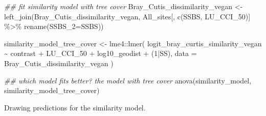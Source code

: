 \documentclass[
  letterpaper,
  DIV=11,
  numbers=noendperiod]{scrartcl}
\newenvironment{Shaded}{\begin{snugshade}}{\end{snugshade}}
\newcommand{\AttributeTok}[1]{\textcolor[rgb]{0.40,0.45,0.13}{#1}}
\newcommand{\DecValTok}[1]{\textcolor[rgb]{0.68,0.00,0.00}{#1}}
\newcommand{\DocumentationTok}[1]{\textcolor[rgb]{0.37,0.37,0.37}{\textit{#1}}}
\newcommand{\FunctionTok}[1]{\textcolor[rgb]{0.28,0.35,0.67}{#1}}
\newcommand{\NormalTok}[1]{\textcolor[rgb]{0.00,0.23,0.31}{#1}}
\newcommand{\OtherTok}[1]{\textcolor[rgb]{0.00,0.23,0.31}{#1}}
\newcommand{\SpecialCharTok}[1]{\textcolor[rgb]{0.37,0.37,0.37}{#1}}
\newcommand{\StringTok}[1]{\textcolor[rgb]{0.13,0.47,0.30}{#1}}
\begin{document}
\begin{Shaded}
\begin{Highlighting}[]
\DocumentationTok{\#\# fit similarity model with tree cover}
\NormalTok{Bray\_Cutis\_dissimilarity\_vegan }\OtherTok{\textless{}{-}} \FunctionTok{left\_join}\NormalTok{(Bray\_Cutis\_dissimilarity\_vegan, }
\NormalTok{                      All\_sites[, }\FunctionTok{c}\NormalTok{(}\StringTok{\textquotesingle{}SSBS\textquotesingle{}}\NormalTok{, }
                                    \StringTok{\textquotesingle{}LU\_CCI\_50\textquotesingle{}}\NormalTok{)] }\SpecialCharTok{\%\textgreater{}\%} 
                        \FunctionTok{rename}\NormalTok{(}\AttributeTok{SSBS\_2=}\NormalTok{SSBS))}

\NormalTok{similarity\_model\_tree\_cover }\OtherTok{\textless{}{-}}\NormalTok{ lme4}\SpecialCharTok{::}\FunctionTok{lmer}\NormalTok{(}
\NormalTok{  logit\_bray\_curtis\_similarity\_vegan }\SpecialCharTok{\textasciitilde{}}\NormalTok{ contrast }\SpecialCharTok{+}\NormalTok{ LU\_CCI\_50 }\SpecialCharTok{+}\NormalTok{ log10\_geodist }\SpecialCharTok{+}\NormalTok{ (}\DecValTok{1}\SpecialCharTok{|}\NormalTok{SS), }
  \AttributeTok{data =}\NormalTok{ Bray\_Cutis\_dissimilarity\_vegan}
\NormalTok{  )}

\DocumentationTok{\#\# which model fits better? the model with tree cover}
\FunctionTok{anova}\NormalTok{(similarity\_model, similarity\_model\_tree\_cover)}
\end{Highlighting}
\end{Shaded}

Drawing predictions for the similarity model.
\end{document}
